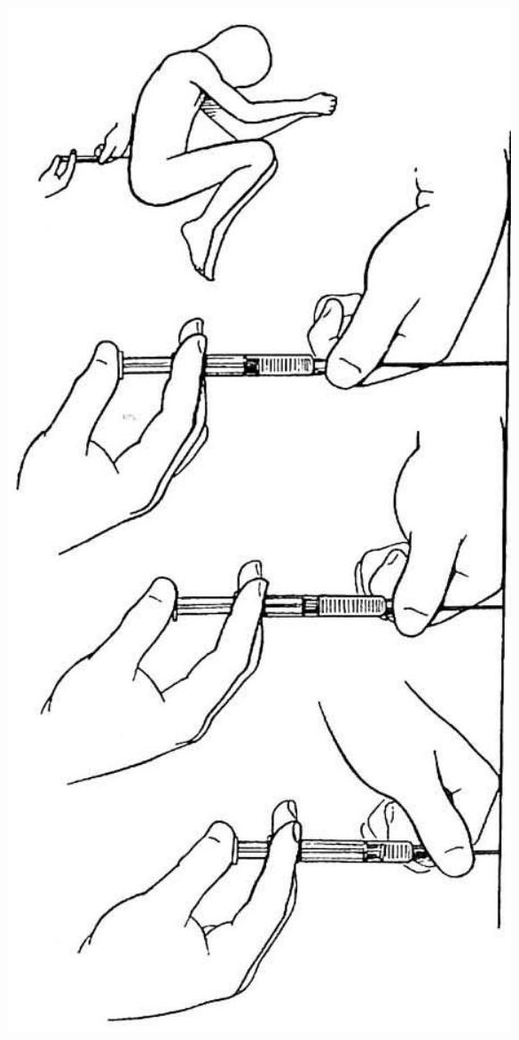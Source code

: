 \documentclass[10pt]{article}
\begin{document}
\begin{center}
\includegraphics[max width=\textwidth]{2024_07_09_002a177993bd97d1d6d7g-065}
\end{center}
\end{document}
